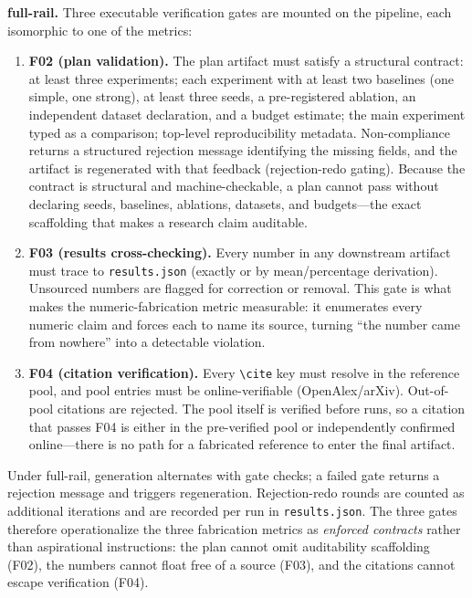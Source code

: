 \documentclass[10pt,twocolumn]{article}
\begin{document}
\textbf{full-rail.} Three executable verification gates are mounted on the pipeline, each isomorphic to one of the metrics:
\begin{enumerate}[leftmargin=*]
\item \textbf{F02 (plan validation).} The plan artifact must satisfy a structural contract: at least three experiments; each experiment with at least two baselines (one simple, one strong), at least three seeds, a pre-registered ablation, an independent dataset declaration, and a budget estimate; the main experiment typed as a comparison; top-level reproducibility metadata. Non-compliance returns a structured rejection message identifying the missing fields, and the artifact is regenerated with that feedback (rejection-redo gating). Because the contract is structural and machine-checkable, a plan cannot pass without declaring seeds, baselines, ablations, datasets, and budgets---the exact scaffolding that makes a research claim auditable.
\item \textbf{F03 (results cross-checking).} Every number in any downstream artifact must trace to \texttt{results.json} (exactly or by mean/percentage derivation). Unsourced numbers are flagged for correction or removal. This gate is what makes the numeric-fabrication metric measurable: it enumerates every numeric claim and forces each to name its source, turning ``the number came from nowhere'' into a detectable violation.
\item \textbf{F04 (citation verification).} Every \texttt{\textbackslash cite} key must resolve in the reference pool, and pool entries must be online-verifiable (OpenAlex/arXiv). Out-of-pool citations are rejected. The pool itself is verified before runs, so a citation that passes F04 is either in the pre-verified pool or independently confirmed online---there is no path for a fabricated reference to enter the final artifact.
\end{enumerate}
Under full-rail, generation alternates with gate checks; a failed gate returns a rejection message and triggers regeneration. Rejection-redo rounds are counted as additional iterations and are recorded per run in \texttt{results.json}. The three gates therefore operationalize the three fabrication metrics as \emph{enforced contracts} rather than aspirational instructions: the plan cannot omit auditability scaffolding (F02), the numbers cannot float free of a source (F03), and the citations cannot escape verification (F04).
\end{document}
